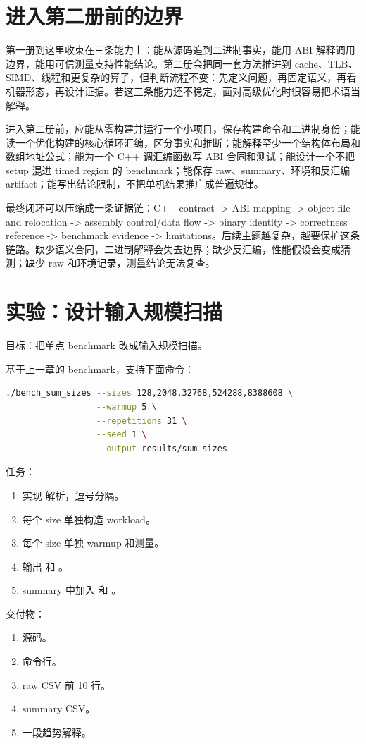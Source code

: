 \section{进入第二册前的边界}

第一册到这里收束在三条能力上：能从源码追到二进制事实，能用 ABI 解释调用边界，能用可信测量支持性能结论。第二册会把同一套方法推进到 cache、TLB、SIMD、线程和更复杂的算子，但判断流程不变：先定义问题，再固定语义，再看机器形态，再设计证据。若这三条能力还不稳定，面对高级优化时很容易把术语当解释。

进入第二册前，应能从零构建并运行一个小项目，保存构建命令和二进制身份；能读一个优化构建的核心循环汇编，区分事实和推断；能解释至少一个结构体布局和数组地址公式；能为一个 C++ 调汇编函数写 ABI 合同和测试；能设计一个不把 setup 混进 timed region 的 benchmark；能保存 raw、summary、环境和反汇编 artifact；能写出结论限制，不把单机结果推广成普遍规律。

最终闭环可以压缩成一条证据链：C++ contract -> ABI mapping -> object file and relocation -> assembly control/data flow -> binary identity -> correctness reference -> benchmark evidence -> limitations。后续主题越复杂，越要保护这条链路。缺少语义合同，二进制解释会失去边界；缺少反汇编，性能假设会变成猜测；缺少 raw 和环境记录，测量结论无法复查。

\section{实验：设计输入规模扫描}

\begin{labbox}
目标：把单点 benchmark 改成输入规模扫描。

基于上一章的  benchmark，支持下面命令：

\begin{lstlisting}[language=bash]
./bench_sum_sizes --sizes 128,2048,32768,524288,8388608 \
                  --warmup 5 \
                  --repetitions 31 \
                  --seed 1 \
                  --output results/sum_sizes
\end{lstlisting}

任务：

\begin{enumerate}
  \item 实现  解析，逗号分隔。
  \item 每个 size 单独构造 workload。
  \item 每个 size 单独 warmup 和测量。
  \item 输出  和 。
  \item summary 中加入 \code{GBps} 和 。
\end{enumerate}

交付物：

\begin{enumerate}
  \item 源码。
  \item 命令行。
  \item raw CSV 前 10 行。
  \item summary CSV。
  \item 一段趋势解释。
\end{enumerate}
\end{labbox}

